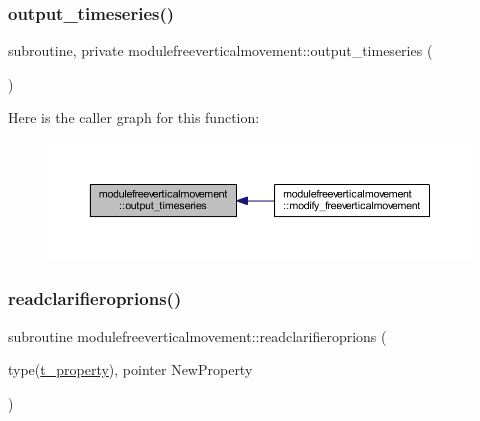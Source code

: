 \subsubsection{\texorpdfstring{output\+\_\+timeseries()}{output\_timeseries()}}
{\footnotesize\ttfamily subroutine, private modulefreeverticalmovement\+::output\+\_\+timeseries (\begin{DoxyParamCaption}{ }\end{DoxyParamCaption})\hspace{0.3cm}{\ttfamily [private]}}

Here is the caller graph for this function\+:\nopagebreak
\begin{figure}[H]
\begin{center}
\leavevmode
\includegraphics[width=350pt]{namespacemodulefreeverticalmovement_a074424b5e6d0b4d4588c869805dbf784_icgraph}
\end{center}
\end{figure}
\mbox{\label{namespacemodulefreeverticalmovement_a2b10bad3ef2fbac72aed08e6bf29bcd6}} 
\subsubsection{\texorpdfstring{readclarifieroprions()}{readclarifieroprions()}}
{\footnotesize\ttfamily subroutine modulefreeverticalmovement\+::readclarifieroprions (\begin{DoxyParamCaption}\item[{type(\mbox{\hyperlink{structmodulefreeverticalmovement_1_1t__property}{t\+\_\+property}}), pointer}]{New\+Property }\end{DoxyParamCaption})\hspace{0.3cm}{\ttfamily [private]}}

